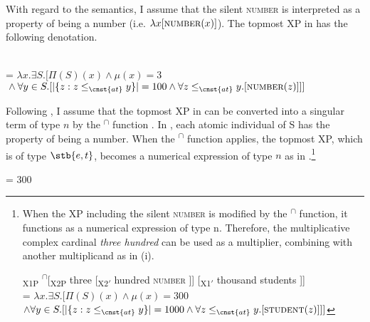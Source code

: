 \documentclass[output=paper]{langscibook}
\begin{document}
With regard to the semantics, I assume that the silent \textsc{number} is interpreted as a property of being a number (i.e. $\lambda x[\textsc{number}(x)]$). The topmost XP in  has the following denotation.

\ea\label{tat:sem.adj}
\\
= $\lambda x.\exists S.[\Pi(S)(x) \wedge \mu(x) = 3$\\
\hspace*{\fill}${}\wedge\forall y\in S.[\vert\{z: z\leq_{\cnst{at}}y\}\vert = 100 \wedge \forall z\leq_{\cnst{at}}y.[\textsc{number}(z)]]]$
\z

\noindent Following \citet{Rothstein2013, Rothstein2017}, I assume that the topmost XP in  can be converted into a singular term of type $n$ by the \textsuperscript{$\cap$} function \citep{Chierchia1985}. In , each atomic individual of S has the property of being a number. When the \textsuperscript{$\cap$} function applies, the topmost XP, which is of type $\stb{e,t}$, becomes a numerical expression of type $n$ as in .\footnote{When the XP including the silent \textsc{number} is modified by the \textsuperscript{$\cap$} function, it functions as a numerical expression of type n. Therefore, the multiplicative complex cardinal \textit{three hundred} can be used as a multiplier, combining with another multiplicand as in (i).

\ea\label{tat:3000}
\ea {[}\textsubscript{X1P} \textsuperscript{$\cap$}[\textsubscript{X2P} three [\textsubscript{X2$'$} hundred \textsc{number} ]] [\textsubscript{X1$'$} thousand students ]]
\ex
{}\\
= $\lambda x.\exists S.[\Pi(S)(x) \wedge \mu(x) = 300$\\
\hspace*{\fill}$\wedge \forall y \in S.[\vert\{z: z\leq_{\cnst{at}}y\}\vert = 1000 \wedge \forall z\leq_{\cnst{at}}y.[\textsc{student}(z)]]]$
\z\z
}

\ea\label{tat:sem.multipl.fin}
 = 300
\z
\end{document}
